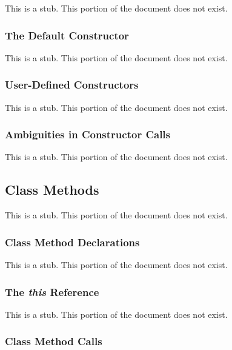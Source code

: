 This is a stub.  This portion of the document does not exist.

\subsubsection{The Default Constructor}
\label{The_Default_Constructor}

This is a stub.  This portion of the document does not exist.

\subsubsection{User-Defined Constructors}
\label{User-Defined_Constructors}

This is a stub.  This portion of the document does not exist.

\subsubsection{Ambiguities in Constructor Calls}
\label{Ambiguities_in_Constructor_Calls}

This is a stub.  This portion of the document does not exist.

\subsection{Class Methods}
\label{Class_Methods}

This is a stub.  This portion of the document does not exist.

\subsubsection{Class Method Declarations}
\label{Class_Method_Declarations}

This is a stub.  This portion of the document does not exist.

\subsubsection{The {\em this} Reference}
\label{The_em_this_Reference}

This is a stub.  This portion of the document does not exist.

\subsubsection{Class Method Calls}
\label{Class_Method_Calls}

